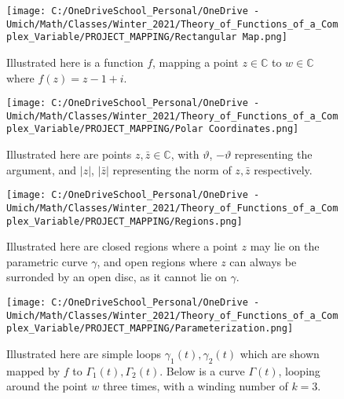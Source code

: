 \documentclass[a4paper,man,natbib]{apa6}
\newcommand{\C}{\mathbb{C}}  %
\begin{document}

\begin{figure}

      \centering
      \texttt{[image: C:/OneDriveSchool\_Personal/OneDrive - Umich/Math/Classes/Winter\_2021/Theory\_of\_Functions\_of\_a\_Complex\_Variable/PROJECT\_MAPPING/Rectangular Map.png]}
      \caption{\label{C:/OneDriveSchool_Personal/OneDrive - Umich/Math/Classes/Winter_2021/Theory_of_Functions_of_a_Complex_Variable/PROJECT_MAPPING/Rectangular Map.png}
      Illustrated here is a function $ f $, mapping a point $ z \in \C $ to $ w \in \C $ where $ f(z) = z -1 +i $.}

\end{figure}

\begin{figure}


      \centering
      \texttt{[image: C:/OneDriveSchool\_Personal/OneDrive - Umich/Math/Classes/Winter\_2021/Theory\_of\_Functions\_of\_a\_Complex\_Variable/PROJECT\_MAPPING/Polar Coordinates.png]}
      \caption{\label{C:/OneDriveSchool_Personal/OneDrive - Umich/Math/Classes/Winter_2021/Theory_of_Functions_of_a_Complex_Variable/PROJECT_MAPPING/Polar Coordinates.png}
      Illustrated here are points $ z, \bar{z} \in \C $, with $ \vartheta $, $ -\vartheta $  representing the argument, and $ |z| $, $ |\bar{z}| $ representing the norm of $ z, \bar{z} $ respectively.}

\end{figure}

\begin{figure}

      \centering
      \texttt{[image: C:/OneDriveSchool\_Personal/OneDrive - Umich/Math/Classes/Winter\_2021/Theory\_of\_Functions\_of\_a\_Complex\_Variable/PROJECT\_MAPPING/Regions.png]}
      \caption{\label{C:/OneDriveSchool_Personal/OneDrive - Umich/Math/Classes/Winter_2021/Theory_of_Functions_of_a_Complex_Variable/PROJECT_MAPPING/Regions.png}
      Illustrated here are closed regions where a point $ z $ may lie on the parametric curve $ \gamma $, 
      and open regions where $ z $ can always be surronded by an open disc, as it cannot lie on $ \gamma $.}

\end{figure}

\begin{figure}

      \centering
      \texttt{[image: C:/OneDriveSchool\_Personal/OneDrive - Umich/Math/Classes/Winter\_2021/Theory\_of\_Functions\_of\_a\_Complex\_Variable/PROJECT\_MAPPING/Parameterization.png]}
      \caption{\label{C:/OneDriveSchool_Personal/OneDrive - Umich/Math/Classes/Winter_2021/Theory_of_Functions_of_a_Complex_Variable/PROJECT_MAPPING/Parameterization.png}
      Illustrated here are simple loops  $ \gamma_{1}(t),\gamma_{2}(t) $ which are shown mapped by $ f $ to $ \Gamma_{1}(t),\Gamma_{2}(t) $. Below is a curve $ \Gamma(t) $, 
	looping around the point $ w $ three times, with a winding number of $ k = 3 $.}

\end{figure}
\end{document}
